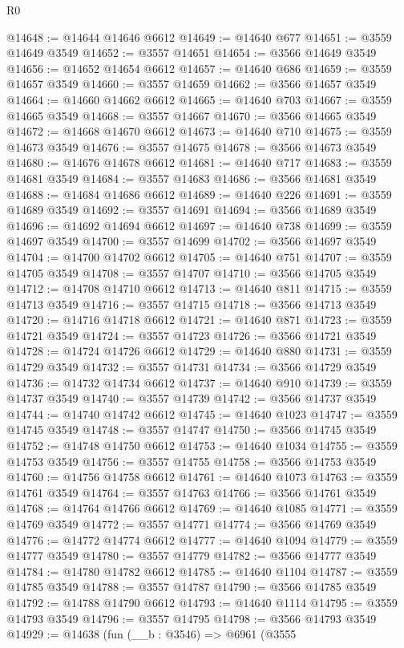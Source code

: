 \begin{lexlean}{R0}
\begin{coremodule}
@14648 := @14644 @14646 @6612
@14649 := @14640 @677
@14651 := @3559 @14649 @3549
@14652 := @3557 @14651
@14654 := @3566 @14649 @3549
@14656 := @14652 @14654 @6612
@14657 := @14640 @686
@14659 := @3559 @14657 @3549
@14660 := @3557 @14659
@14662 := @3566 @14657 @3549
@14664 := @14660 @14662 @6612
@14665 := @14640 @703
@14667 := @3559 @14665 @3549
@14668 := @3557 @14667
@14670 := @3566 @14665 @3549
@14672 := @14668 @14670 @6612
@14673 := @14640 @710
@14675 := @3559 @14673 @3549
@14676 := @3557 @14675
@14678 := @3566 @14673 @3549
@14680 := @14676 @14678 @6612
@14681 := @14640 @717
@14683 := @3559 @14681 @3549
@14684 := @3557 @14683
@14686 := @3566 @14681 @3549
@14688 := @14684 @14686 @6612
@14689 := @14640 @226
@14691 := @3559 @14689 @3549
@14692 := @3557 @14691
@14694 := @3566 @14689 @3549
@14696 := @14692 @14694 @6612
@14697 := @14640 @738
@14699 := @3559 @14697 @3549
@14700 := @3557 @14699
@14702 := @3566 @14697 @3549
@14704 := @14700 @14702 @6612
@14705 := @14640 @751
@14707 := @3559 @14705 @3549
@14708 := @3557 @14707
@14710 := @3566 @14705 @3549
@14712 := @14708 @14710 @6612
@14713 := @14640 @811
@14715 := @3559 @14713 @3549
@14716 := @3557 @14715
@14718 := @3566 @14713 @3549
@14720 := @14716 @14718 @6612
@14721 := @14640 @871
@14723 := @3559 @14721 @3549
@14724 := @3557 @14723
@14726 := @3566 @14721 @3549
@14728 := @14724 @14726 @6612
@14729 := @14640 @880
@14731 := @3559 @14729 @3549
@14732 := @3557 @14731
@14734 := @3566 @14729 @3549
@14736 := @14732 @14734 @6612
@14737 := @14640 @910
@14739 := @3559 @14737 @3549
@14740 := @3557 @14739
@14742 := @3566 @14737 @3549
@14744 := @14740 @14742 @6612
@14745 := @14640 @1023
@14747 := @3559 @14745 @3549
@14748 := @3557 @14747
@14750 := @3566 @14745 @3549
@14752 := @14748 @14750 @6612
@14753 := @14640 @1034
@14755 := @3559 @14753 @3549
@14756 := @3557 @14755
@14758 := @3566 @14753 @3549
@14760 := @14756 @14758 @6612
@14761 := @14640 @1073
@14763 := @3559 @14761 @3549
@14764 := @3557 @14763
@14766 := @3566 @14761 @3549
@14768 := @14764 @14766 @6612
@14769 := @14640 @1085
@14771 := @3559 @14769 @3549
@14772 := @3557 @14771
@14774 := @3566 @14769 @3549
@14776 := @14772 @14774 @6612
@14777 := @14640 @1094
@14779 := @3559 @14777 @3549
@14780 := @3557 @14779
@14782 := @3566 @14777 @3549
@14784 := @14780 @14782 @6612
@14785 := @14640 @1104
@14787 := @3559 @14785 @3549
@14788 := @3557 @14787
@14790 := @3566 @14785 @3549
@14792 := @14788 @14790 @6612
@14793 := @14640 @1114
@14795 := @3559 @14793 @3549
@14796 := @3557 @14795
@14798 := @3566 @14793 @3549
@14929 := @14638
    (fun (__b : @3546) =>
    @6961
      (@3555

\end{coremodule}
\end{lexlean}
